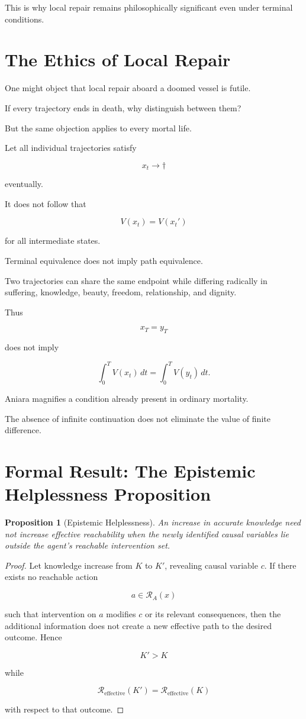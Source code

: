 \documentclass[11pt,oneside]{book}
\newtheorem{proposition}[theorem]{Proposition}
\theoremstyle{definition}
\theoremstyle{remark}
\newcommand{\R}{\mathcal{R}}
\begin{document}
This is why local repair remains philosophically significant even under terminal conditions.

\section{The Ethics of Local Repair}

One might object that local repair aboard a doomed vessel is futile.

If every trajectory ends in death, why distinguish between them?

But the same objection applies to every mortal life.

Let all individual trajectories satisfy

\[
x_t\rightarrow\dagger
\]

eventually.

It does not follow that

\[
V(x_t)=V(x_t')
\]

for all intermediate states.

Terminal equivalence does not imply path equivalence.

Two trajectories can share the same endpoint while differing radically in suffering, knowledge, beauty, freedom, relationship, and dignity.

Thus

\[
x_T=y_T
\]

does not imply

\[
\int_0^T V(x_t)\,dt
=
\int_0^T V(y_t)\,dt.
\]

Aniara magnifies a condition already present in ordinary mortality.

The absence of infinite continuation does not eliminate the value of finite difference.

\section{Formal Result: The Epistemic Helplessness Proposition}

\begin{proposition}[Epistemic Helplessness]
An increase in accurate knowledge need not increase effective reachability when the newly identified causal variables lie outside the agent's reachable intervention set.
\end{proposition}

\begin{proof}
Let knowledge increase from \(K\) to \(K'\), revealing causal variable \(c\). If there exists no reachable action

\[
a\in\R_A(x)
\]

such that intervention on \(a\) modifies \(c\) or its relevant consequences, then the additional information does not create a new effective path to the desired outcome. Hence

\[
K'>K
\]

while

\[
\R_{\mathrm{effective}}(K')
=
\R_{\mathrm{effective}}(K)
\]

with respect to that outcome.
\end{proof}
\end{document}
